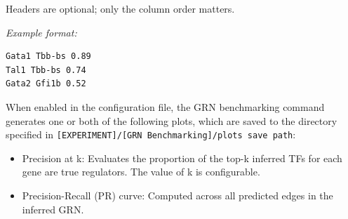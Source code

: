 \begin{tcolorbox}
Headers are optional; only the column order matters.

\textit{Example format:}
\begin{codeblock}
\begin{verbatim}
Gata1 Tbb-bs 0.89
Tal1 Tbb-bs 0.74
Gata2 Gfi1b 0.52 
\end{verbatim}
\end{codeblock}

When enabled in the configuration file, the GRN benchmarking command generates one or both
of the following plots, which are saved to the directory specified in \texttt{[EXPERIMENT]/[GRN Benchmarking]/plots save path}:

\begin{itemize}
	\item Precision at k: Evaluates the proportion of the top-k inferred TFs for each gene are true
regulators. The value of k is configurable. 
	\item Precision-Recall (PR) curve: Computed across all predicted edges in the inferred GRN. 
\end{itemize}


\end{tcolorbox}
